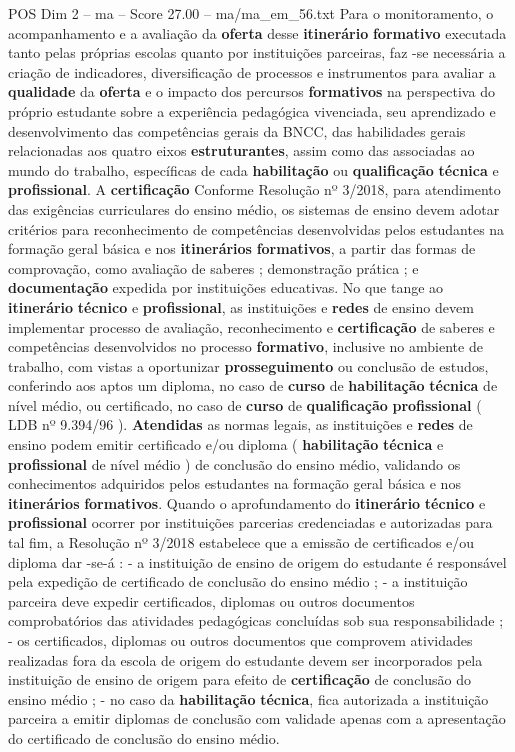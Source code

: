 \begin{textsample}{POS Dim 2 – ma – Score 27.00 – ma/ma\_em\_56.txt}
Para o monitoramento, o acompanhamento e a avaliação da \textbf{oferta} desse \textbf{itinerário} \textbf{formativo} executada tanto pelas próprias escolas quanto por instituições parceiras, faz -se necessária a criação de indicadores, diversificação de processos e instrumentos para avaliar a \textbf{qualidade} da \textbf{oferta} e o impacto dos percursos \textbf{formativos} na perspectiva do próprio estudante sobre a experiência pedagógica vivenciada, seu aprendizado e desenvolvimento das competências gerais da BNCC, das habilidades gerais relacionadas aos quatro eixos \textbf{estruturantes}, assim como das associadas ao mundo do trabalho, específicas de cada \textbf{habilitação} ou \textbf{qualificação} \textbf{técnica} e \textbf{profissional}.
A \textbf{certificação} Conforme Resolução nº 3/2018, para atendimento das exigências curriculares do ensino médio, os sistemas de ensino devem adotar critérios para reconhecimento de competências desenvolvidas pelos estudantes na formação geral básica e nos \textbf{itinerários} \textbf{formativos}, a partir das formas de comprovação, como avaliação de saberes ; demonstração prática ; e \textbf{documentação} expedida por instituições educativas.
No que tange ao \textbf{itinerário} \textbf{técnico} e \textbf{profissional}, as instituições e \textbf{redes} de ensino devem implementar processo de avaliação, reconhecimento e \textbf{certificação} de saberes e competências desenvolvidos no processo \textbf{formativo}, inclusive no ambiente de trabalho, com vistas a oportunizar \textbf{prosseguimento} ou conclusão de estudos, conferindo aos aptos um diploma, no caso de \textbf{curso} de \textbf{habilitação} \textbf{técnica} de nível médio, ou certificado, no caso de \textbf{curso} de \textbf{qualificação} \textbf{profissional} ( LDB nº 9.394/96 ). \textbf{Atendidas} as normas legais, as instituições e \textbf{redes} de ensino podem emitir certificado e/ou diploma ( \textbf{habilitação} \textbf{técnica} e \textbf{profissional} de nível médio ) de conclusão do ensino médio, validando os conhecimentos adquiridos pelos estudantes na formação geral básica e nos \textbf{itinerários} \textbf{formativos}.
Quando o aprofundamento do \textbf{itinerário} \textbf{técnico} e \textbf{profissional} ocorrer por instituições parcerias credenciadas e autorizadas para tal fim, a Resolução nº 3/2018 estabelece que a emissão de certificados e/ou diploma dar -se-á : - a instituição de ensino de origem do estudante é responsável pela expedição de certificado de conclusão do ensino médio ; - a instituição parceira deve expedir certificados, diplomas ou outros documentos comprobatórios das atividades pedagógicas concluídas sob sua responsabilidade ; - os certificados, diplomas ou outros documentos que comprovem atividades realizadas fora da escola de origem do estudante devem ser incorporados pela instituição de ensino de origem para efeito de \textbf{certificação} de conclusão do ensino médio ; - no caso da \textbf{habilitação} \textbf{técnica}, fica autorizada a instituição parceira a emitir diplomas de conclusão com validade apenas com a apresentação do certificado de conclusão do ensino médio.

\end{textsample}
